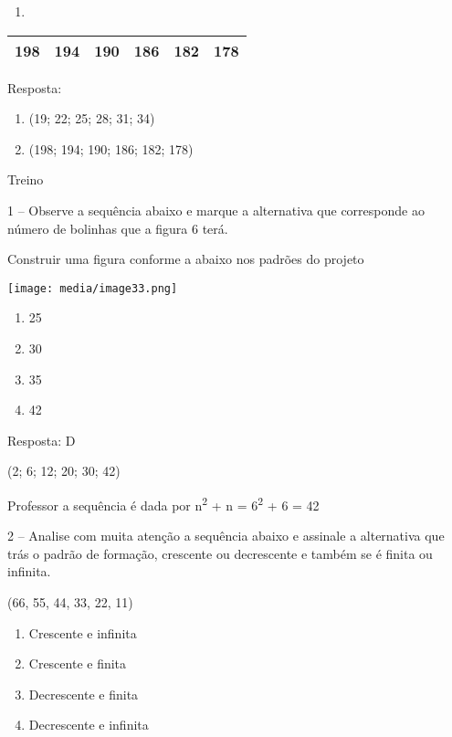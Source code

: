 \begin{enumerate}
\def\labelenumi{\alph{enumi})}
\item
\end{enumerate}

\begin{longtable}[]{@{}llllll@{}}
\toprule
198 & 194 & 190 & 186 & 182 & 178\tabularnewline
\bottomrule
\end{longtable}

Resposta:

\begin{enumerate}
\def\labelenumi{\alph{enumi})}
\item
  (19; 22; 25; 28; 31; 34)
\item
  (198; 194; 190; 186; 182; 178)
\end{enumerate}

Treino

1 -- Observe a sequência abaixo e marque a alternativa que corresponde
ao número de bolinhas que a figura 6 terá.

Construir uma figura conforme a abaixo nos padrões do projeto

\texttt{[image: media/image33.png]}

\begin{enumerate}
\def\labelenumi{\alph{enumi})}
\item
  25
\item
  30
\item
  35
\item
  42
\end{enumerate}

Resposta: D

(2; 6; 12; 20; 30; 42)

Professor a sequência é dada por n\textsuperscript{2} + n =
6\textsuperscript{2} + 6 = 42

2 -- Analise com muita atenção a sequência abaixo e assinale a
alternativa que trás o padrão de formação, crescente ou decrescente e
também se é finita ou infinita.

(66, 55, 44, 33, 22, 11)

\begin{enumerate}
\def\labelenumi{\alph{enumi})}
\item
  Crescente e infinita
\item
  Crescente e finita
\item
  Decrescente e finita
\item
  Decrescente e infinita
\end{enumerate}


